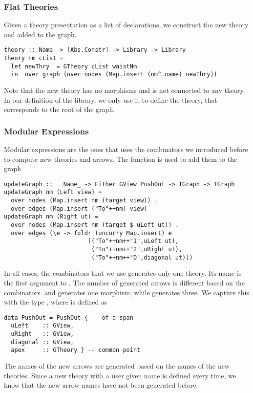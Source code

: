 \subsubsection{Flat Theories}
Given a theory presentation as a list of declarations, we construct the new theory and added to the graph. 
\begin{verbatim}
theory :: Name -> [Abs.Constr] -> Library -> Library
theory nm cList =
  let newThry  = GTheory cList waistNm
  in  over graph (over nodes (Map.insert (nm^.name) newThry))
\end{verbatim}
Note that the new theory has no morphisms and is not connected to any theory. In our definition of the library, we only use it to define the  theory, that corresponds to the root of the graph. 

\subsubsection{Modular Expressions}
Modular expressions are the ones that uses the combinators we introduced before to compute new theories and arrows. The function  is used to add them to the graph 
\begin{verbatim}
updateGraph ::   Name_ -> Either GView PushOut -> TGraph -> TGraph
updateGraph nm (Left view) =
  over nodes (Map.insert nm (target view)) .
  over edges (Map.insert ("To"++nm) view)
updateGraph nm (Right ut) =
  over nodes (Map.insert nm (target $ uLeft ut)) .
  over edges (\e -> foldr (uncurry Map.insert) e 
                        [("To"++nm++"1",uLeft ut),
                         ("To"++nm++"2",uRight ut),
                         ("To"++nm++"D",diagonal ut)])
\end{verbatim}
In all cases, the combinators that we use generates only one theory. Its name is the first argument to . The number of generated arrows is different based on the combinators.  and  generates one morphism, while  generates three. We capture this with the type , where  is defined as 
\begin{verbatim}
data PushOut = PushOut { -- of a span
  uLeft    :: GView,
  uRight   :: GView,
  diagonal :: GView,
  apex     :: GTheory } -- common point
\end{verbatim}
The names of the new arrows are generated based on the names of the new theories. Since a new theory with a user given name is defined every time, we know that the new arrow names have not been generated before. 

